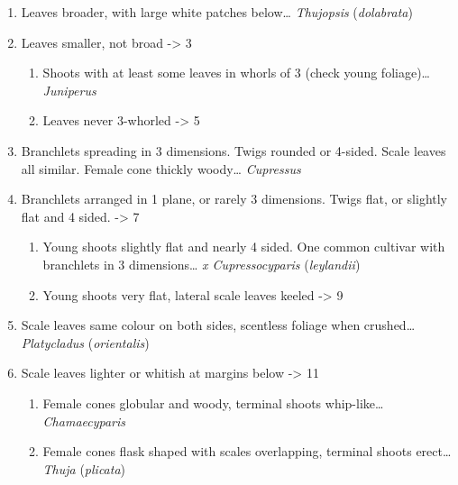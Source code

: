 \documentclass[openany]{book}
\providecommand{\tightlist}{%
  \setlength{\itemsep}{0pt}\setlength{\parskip}{0pt}}
\begin{document}
\begin{enumerate}
\def\labelenumi{\arabic{enumi}.}
\tightlist
\item
  Leaves broader, with large white patches below\ldots{}
  \emph{Thujopsis} (\emph{dolabrata})
\item
  Leaves smaller, not broad -\textgreater{} 3

  \begin{enumerate}
  \def\labelenumii{\arabic{enumii}.}
  \setcounter{enumii}{2}
  \tightlist
  \item
    Shoots with at least some leaves in whorls of 3 (check young
    foliage)\ldots{} \emph{Juniperus}
  \item
    Leaves never 3-whorled -\textgreater{} 5
  \end{enumerate}
\item
  Branchlets spreading in 3 dimensions. Twigs rounded or 4-sided. Scale
  leaves all similar. Female cone thickly woody\ldots{} \emph{Cupressus}
\item
  Branchlets arranged in 1 plane, or rarely 3 dimensions. Twigs flat, or
  slightly flat and 4 sided. -\textgreater{} 7

  \begin{enumerate}
  \def\labelenumii{\arabic{enumii}.}
  \setcounter{enumii}{6}
  \tightlist
  \item
    Young shoots slightly flat and nearly 4 sided. One common cultivar
    with branchlets in 3 dimensions\ldots{} \emph{x Cupressocyparis}
    (\emph{leylandii})
  \item
    Young shoots very flat, lateral scale leaves keeled -\textgreater{}
    9
  \end{enumerate}
\item
  Scale leaves same colour on both sides, scentless foliage when
  crushed\ldots{} \emph{Platycladus} (\emph{orientalis})
\item
  Scale leaves lighter or whitish at margins below -\textgreater{} 11

  \begin{enumerate}
  \def\labelenumii{\arabic{enumii}.}
  \setcounter{enumii}{10}
  \tightlist
  \item
    Female cones globular and woody, terminal shoots whip-like\ldots{}
    \emph{Chamaecyparis}
  \item
    Female cones flask shaped with scales overlapping, terminal shoots
    erect\ldots{} \emph{Thuja} (\emph{plicata})
  \end{enumerate}
\end{enumerate}
\end{document}
